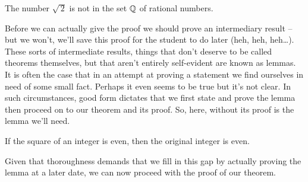 \begin{thm} The number $\sqrt{\,2}$ is not in the set ${\mathbb Q}$ of
rational numbers.
\end{thm}

Before we can actually give the proof we should prove an intermediary 
result -- but we won't, we'll save this proof for the student to do 
later (heh, heh, heh\ldots).
These sorts of intermediate results, things that don't deserve to be
called theorems themselves, but that aren't entirely self-evident are
known as  lemmas.  It is often the case that in an 
attempt at proving a statement we find ourselves in need of some small 
fact.  Perhaps it even seems to be true but it's not clear.  In such 
circumstances, good form dictates that we first state and prove the 
lemma then proceed on to our theorem and its proof.  So, here, without 
its proof is the lemma we'll need.

\begin{lem} If the square of an integer is even, then the original
integer is even.
\end{lem}

Given that thoroughness demands that we fill in this gap by actually
proving the lemma at a later date, we can now proceed with the proof
of our theorem.   

